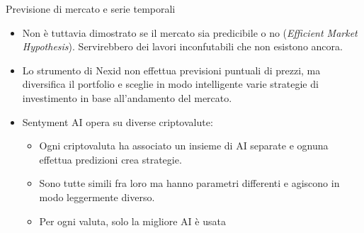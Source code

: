 \documentclass{beamer}
\begin{document}
\begin{frame}{Previsione di mercato e serie temporali}
\begin{itemize}
\item Non è tuttavia dimostrato se il mercato sia predicibile o no (\textit{Efficient Market Hypothesis}).
Servirebbero dei lavori inconfutabili che non esistono ancora.
\item Lo strumento di Nexid non effettua previsioni puntuali di prezzi, ma diversifica il portfolio e sceglie in modo intelligente varie strategie di investimento in base all'andamento del mercato.
\item Sentyment AI opera su diverse criptovalute:
\begin{itemize}
    \item Ogni criptovaluta ha associato un insieme di AI separate e ognuna effettua predizioni crea strategie. \item Sono tutte simili fra loro ma hanno parametri differenti e agiscono in modo leggermente diverso.
    \item Per ogni valuta, solo la migliore AI è usata
\end{itemize}
\end{itemize}
\end{frame}
\end{document}
